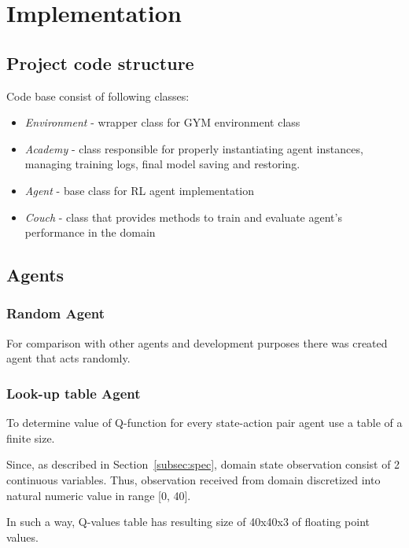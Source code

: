 \documentclass[12pt]{article}
\begin{document}
\newpage
\section{Implementation}
\subsection{Project code structure}{
Code base consist of following classes:
\begin{itemize}
\item \textit{Environment} - wrapper class for GYM environment class
\item \textit{Academy} - class responsible for properly instantiating agent instances, managing training logs, final model saving and restoring.
\item \textit{Agent} - base class for RL agent implementation
\item \textit{Couch} - class that provides methods to train and evaluate agent's performance in the domain
\end{itemize}
}
\subsection{Agents}
\subsubsection{Random Agent}{
For comparison with other agents and development purposes there was created agent that acts randomly.
}
\subsubsection{Look-up table Agent}{
To determine value of Q-function for every state-action pair agent use a table of a finite size.\par
Since, as described in Section~\ref{subsec:spec}, domain state observation consist of 2 continuous variables. Thus, observation received from domain discretized into natural numeric value in range [0, 40].\par
In such a way, Q-values table has resulting size of 40x40x3 of floating point values.
}
\end{document}
